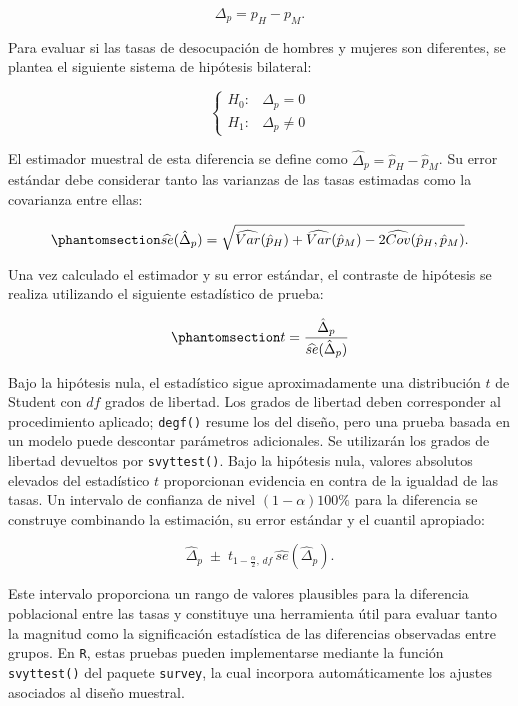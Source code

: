 \documentclass[
  spanish,
  11pt,
  letterpaper,
  oneside,
  open=any]{scrbook}
\begin{document}
\[
\Delta_p = p_H - p_M.
\]

Para evaluar si las tasas de desocupación de hombres y mujeres son
diferentes, se plantea el siguiente sistema de hipótesis bilateral:

\[
\begin{cases}
H_{0}: & \Delta_p = 0  \\
H_{1}: & \Delta_p \neq 0 
\end{cases}
\]

El estimador muestral de esta diferencia se define como
\(\hat{\Delta}_p = \hat{p}_H - \hat{p}_M\). Su error estándar debe
considerar tanto las varianzas de las tasas estimadas como la covarianza
entre ellas:

\begin{equation}\protect\phantomsection\label{eq-error-diferencia-proporciones}{
\widehat{se}(\hat{\Delta}_p) =
\sqrt{
\widehat{Var}(\hat{p}_H)
+
\widehat{Var}(\hat{p}_M)
-
2\widehat{Cov}(\hat{p}_H,\hat{p}_M)
}.
}\end{equation}

Una vez calculado el estimador y su error estándar, el contraste de
hipótesis se realiza utilizando el siguiente estadístico de prueba:

\begin{equation}\protect\phantomsection\label{eq-prueba-diferencia-proporciones}{
t =
\frac{\hat{\Delta}_p}
{\widehat{se}(\hat{\Delta}_p)}
}\end{equation}

Bajo la hipótesis nula, el estadístico sigue aproximadamente una
distribución \(t\) de Student con \(df\) grados de libertad. Los grados
de libertad deben corresponder al procedimiento aplicado;
\texttt{degf()} resume los del diseño, pero una prueba basada en un
modelo puede descontar parámetros adicionales. Se utilizarán los grados
de libertad devueltos por \texttt{svyttest()}. Bajo la hipótesis nula,
valores absolutos elevados del estadístico \(t\) proporcionan evidencia
en contra de la igualdad de las tasas. Un intervalo de confianza de
nivel \((1-\alpha)100\%\) para la diferencia se construye combinando la
estimación, su error estándar y el cuantil apropiado:

\[
\hat{\Delta}_p
\;\pm\;
t_{1-\frac{\alpha}{2},\,df}
\,\widehat{se}(\hat{\Delta}_p).
\]

Este intervalo proporciona un rango de valores plausibles para la
diferencia poblacional entre las tasas y constituye una herramienta útil
para evaluar tanto la magnitud como la significación estadística de las
diferencias observadas entre grupos. En \texttt{R}, estas pruebas pueden
implementarse mediante la función \texttt{svyttest()} del paquete
\texttt{survey}, la cual incorpora automáticamente los ajustes asociados
al diseño muestral.
\end{document}
